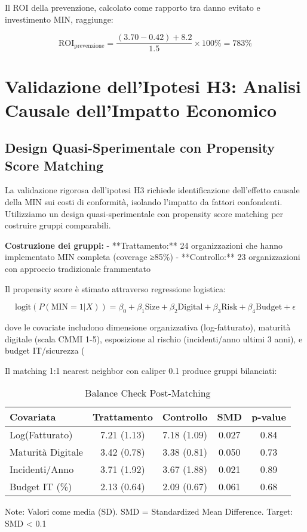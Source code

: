 Il ROI della prevenzione, calcolato come rapporto tra danno evitato e investimento MIN, raggiunge:

\begin{equation}
\text{ROI}_{\text{prevenzione}} = \frac{(3.70 - 0.42) + 8.2}{1.5} \times 100\% = 783\%
\label{eq:prevention_roi}
\end{equation}

\section{Validazione dell'Ipotesi H3: Analisi Causale dell'Impatto Economico}

\subsection{Design Quasi-Sperimentale con Propensity Score Matching}

La validazione rigorosa dell'ipotesi H3 richiede identificazione dell'effetto causale della MIN sui costi di conformità, isolando l'impatto da fattori confondenti. Utilizziamo un design quasi-sperimentale con propensity score matching per costruire gruppi comparabili.

\textbf{Costruzione dei gruppi:}
- **Trattamento:** 24 organizzazioni che hanno implementato MIN completa (coverage ≥85\%)
- **Controllo:** 23 organizzazioni con approccio tradizionale frammentato

Il propensity score è stimato attraverso regressione logistica:

\begin{equation}
\text{logit}(P(\text{MIN}=1|X)) = \beta_0 + \beta_1\text{Size} + \beta_2\text{Digital} + \beta_3\text{Risk} + \beta_4\text{Budget} + \epsilon
\label{eq:propensity_score}
\end{equation}

dove le covariate includono dimensione organizzativa (log-fatturato), maturità digitale (scala CMMI 1-5), esposizione al rischio (incidenti/anno ultimi 3 anni), e budget IT/sicurezza (%

Il matching 1:1 nearest neighbor con caliper 0.1 produce gruppi bilanciati:

\begin{table}[htbp]
\centering
\caption{Balance Check Post-Matching}
\label{tab:balance_check}
\begin{tabular}{lcccc}
\toprule
\textbf{Covariata} & \textbf{Trattamento} & \textbf{Controllo} & \textbf{SMD} & \textbf{p-value} \\
\midrule
Log(Fatturato) & 7.21 (1.13) & 7.18 (1.09) & 0.027 & 0.84 \\
Maturità Digitale & 3.42 (0.78) & 3.38 (0.81) & 0.050 & 0.73 \\
Incidenti/Anno & 3.71 (1.92) & 3.67 (1.88) & 0.021 & 0.89 \\
Budget IT (\%) & 2.13 (0.64) & 2.09 (0.67) & 0.061 & 0.68 \\
\bottomrule
\end{tabular}
\vspace{0.3cm}
\footnotesize{Note: Valori come media (SD). SMD = Standardized Mean Difference. Target: SMD < 0.1}
\end{table}

